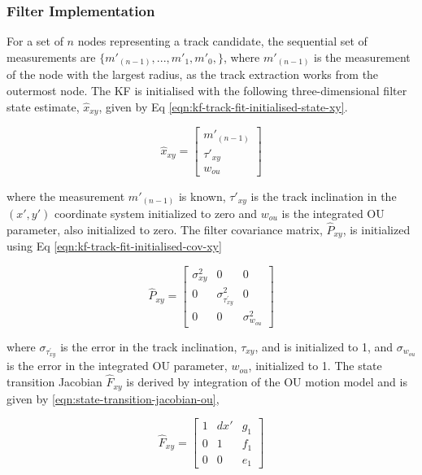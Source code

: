 \subsubsection{Filter Implementation}

For a set of $n$ nodes representing a track candidate, the sequential set of measurements are $\{m'_{(n-1)}, ..., m'_1, m'_0, \}$, where $m'_{(n-1)}$ is the measurement of the node with the largest radius, as the track extraction works from the outermost node. The KF is initialised with the following three-dimensional filter state estimate, $\hat{x}_{xy}$, given by Eq \eqref{eqn:kf-track-fit-initialised-state-xy}.


\begin{equation}
\hat{x}_{xy} = \begin{bmatrix} m'_{(n-1)} \\ \tau'_{xy} \\ w_{ou} \end{bmatrix} 
\label{eqn:kf-track-fit-initialised-state-xy}
\end{equation}

where the measurement $m'_{(n-1)}$ is known, $\tau'_{xy}$ is the track inclination in the $(x', y')$ coordinate system initialized to zero and $w_{ou}$ is the integrated OU parameter, also initialized to zero. The filter covariance matrix, $\hat{P}_{xy}$, is initialized using Eq \eqref{eqn:kf-track-fit-initialised-cov-xy}

\begin{equation}
\hat{P}_{xy} = \begin{bmatrix} \sigma_{xy}^2 & 0 & 0 
                            \\ 0 & \sigma_{\tau^{'}_{xy}}^2 & 0 
                            \\ 0 & 0 & \sigma_{w_{ou}}^2 \end{bmatrix} 
\label{eqn:kf-track-fit-initialised-cov-xy}
\end{equation}

where $\sigma_{\tau^{'}_{xy}}$ is the error in the track inclination, $\tau_{xy}$, and is initialized to 1, and $\sigma_{w_{ou}}$ is the error in the integrated OU parameter, $w_{ou}$, initialized to 1. The state transition Jacobian $\hat{F}_{xy}$ is derived by integration of the OU motion model \cite{OU} and is given by \eqref{eqn:state-transition-jacobian-ou},

\begin{equation}
\hat{F}_{xy} = \begin{bmatrix} 1 & dx' & g_1 \\ 0 & 1 & f_1 \\ 0 & 0 & e_1 \end{bmatrix} 
\label{eqn:state-transition-jacobian-ou}
\end{equation}

